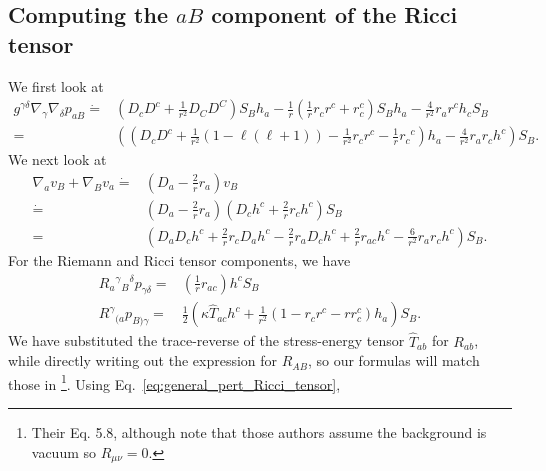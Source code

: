 \documentclass[12pt]{report}
\begin{document}
\subsection{Computing the $aB$ component of the Ricci tensor}
We first look at
\begin{align}
    g^{\gamma\delta}\nabla_{\gamma}\nabla_{\delta}p_{aB}
    \dot{=}&
    \left(
        D_cD^c + \frac{1}{r^2}D_CD^C
    \right)
    S_B
    h_a
    -
    \frac{1}{r}
    \left(
        \frac{1}{r}r_cr^c
        +
        r_c^c 
    \right)
    S_Bh_a
    -
    \frac{4}{r^2}r_ar^ch_cS_B
    \nonumber\\
    =&
    \left(
        \left(
            D_cD^c
            +
            \frac{1}{r^2}\left(1-\ell\left(\ell+1\right)\right)
            -
            \frac{1}{r^2}r_cr^c
            -
            \frac{1}{r}r_c{}^c
        \right)
        h_{a}
        -
        \frac{4}{r^2}r_ar_c
        h^{c}
    \right)
    S_B
    .
\end{align}
We next look at
\begin{align}
    \nabla_av_B
    +
    \nabla_Bv_a
    \dot{=}&
    \left(
        D_a
        -
        \frac{2}{r}r_a
    \right)
    v_B
    \nonumber\\
    \dot{=}&
    \left(D_a-\frac{2}{r}r_a\right)
    \left(
        D_ch^c
        +
        \frac{2}{r}r_ch^c
    \right)
    S_B
    \nonumber\\
    =&
    \left(
        D_aD_ch^c
        +
        \frac{2}{r}r_cD_ah^c
        -
        \frac{2}{r}r_aD_ch^c
        +
        \frac{2}{r}r_{ac}h^c
        -
        \frac{6}{r^2}r_ar_ch^c
    \right)
    S_B
    .
\end{align}
For the Riemann and Ricci tensor components, we have
\begin{align}
    R_a{}^{\gamma}{}_B{}^{\delta}p_{\gamma\delta}
    =&
    \left(\frac{1}{r}r_{ac}\right)h^c S_B
    \\
    R^{\gamma}{}_{(a}p_{B)\gamma}
    =&
    \frac{1}{2}\left(
        \kappa\hat{T}_{ac}h^c
        +
        \frac{1}{r^2}\left(1-r_cr^c-rr_c^c\right)h_a
    \right)
    S_B
    .
\end{align}
We have substituted the trace-reverse of the stress-energy
tensor $\hat{T}_{ab}$ for $R_{ab}$, while directly writing out
the expression for $R_{AB}$, so our formulas will match those in
\cite{Martel:2005ir}\footnote{Their Eq. 5.8, although note that
those authors assume the background is vacuum so $R_{\mu\nu}=0$.}. 
Using Eq.~\eqref{eq:general_pert_Ricci_tensor}, 
\end{document}

